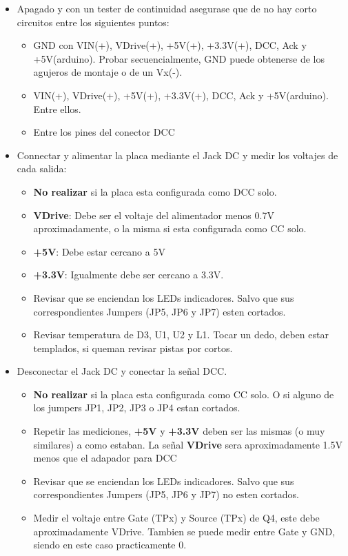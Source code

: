 \begin{itemize}
	\item Apagado y con un tester de continuidad asegurase que de no hay corto circuitos entre los siguientes puntos:

\begin{itemize}
\item GND con VIN(+), VDrive(+), +5V(+), +3.3V(+), DCC, Ack y +5V(arduino). Probar secuencialmente, GND puede obtenerse de los agujeros de montaje o de un Vx(-).
\item  VIN(+), VDrive(+), +5V(+), +3.3V(+), DCC, Ack y +5V(arduino). Entre ellos.
\item Entre los pines del conector DCC
\end{itemize}

\item Connectar y alimentar la placa mediante el Jack DC y medir los voltajes de cada salida:
	\begin{itemize}
	\item \textbf{No realizar} si la placa esta configurada como DCC solo. 
	\item \textbf{VDrive}: Debe ser el voltaje del alimentador menos 0.7V aproximadamente, o la misma si esta configurada como CC solo.
	\item \textbf{+5V}: Debe estar cercano a 5V
	\item \textbf{+3.3V}: Igualmente debe ser cercano a 3.3V.
	\item Revisar que se enciendan los LEDs indicadores. Salvo que sus correspondientes Jumpers (JP5, JP6 y JP7) esten cortados.
	\item Revisar temperatura de D3, U1, U2 y L1. Tocar un dedo, deben estar templados, si queman revisar pistas por cortos.
	\end{itemize}
\item Desconectar el Jack DC y conectar la señal DCC.
	\begin{itemize}

	\item \textbf{No realizar} si la placa esta configurada como CC solo. O si alguno de los  jumpers JP1, JP2, JP3 o JP4 estan cortados.

	\item Repetir las mediciones, \textbf{+5V} y \textbf{+3.3V} deben ser las mismas (o muy similares) a como estaban. La señal \textbf{VDrive} sera aproximadamente 1.5V menos que el adapador para DCC
	\item Revisar que se enciendan los LEDs indicadores. Salvo que sus correspondientes Jumpers (JP5, JP6 y JP7) no esten cortados.
\item Medir el voltaje entre Gate (TPx) y Source (TPx) de Q4, este debe aproximadamente VDrive. Tambien se puede medir entre Gate y GND, siendo en este caso practicamente 0.


\end{itemize}
\end{itemize}
